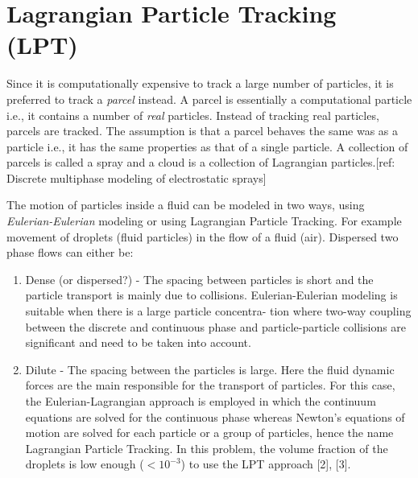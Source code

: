 \begin{itemize}
\end{itemize}



\section{Lagrangian Particle Tracking (LPT)}

Since it is computationally expensive to track a large number of particles, it is preferred to track a \emph{parcel} instead. A parcel is essentially a computational particle i.e., it contains a number of \emph{real} particles. Instead of tracking real particles, parcels are tracked. The assumption is that a parcel behaves the same was as a particle i.e., it has the same properties as that of a single particle. A collection of parcels is called a spray and a cloud is a collection of Lagrangian particles.[ref: Discrete multiphase modeling of electrostatic sprays]


The motion of particles inside a fluid can be modeled in two ways, using \emph{Eulerian-Eulerian} modeling or using Lagrangian Particle Tracking. For example movement of droplets (fluid particles) in the flow of a fluid (air). Dispersed two phase flows can either be:
\begin{enumerate}
  \item Dense (or dispersed?) - The spacing between particles is short and the particle transport is mainly due to collisions. Eulerian-Eulerian modeling is suitable when there is a large particle concentra- tion where two-way coupling between the discrete and continuous phase and particle-particle collisions are significant and need to be taken into account.

  \item Dilute - The spacing between the particles is large. Here the fluid
    dynamic forces are the main responsible for the transport of particles. For
    this case, the Eulerian-Lagrangian approach is employed in which the
    continuum equations are solved for the continuous phase whereas Newton's
    equations of motion are solved for each particle or a group of particles,
    hence the name Lagrangian Particle Tracking. In this problem, the volume
    fraction of the droplets is low enough ($< 10^{-3}$) to use the LPT approach [2],
    [3].
\end{enumerate}


